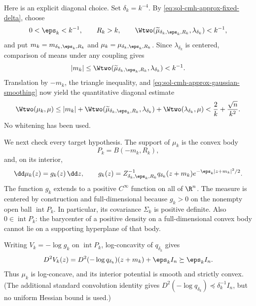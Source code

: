 \documentclass[../main.tex]{subfiles}
\begin{document}
Here is an explicit diagonal choice.  Set $\delta_k=k^{-4}$.  By
\eqref{eq:sol-cmh-approx-fixed-delta}, choose
\[
  0<\eps_k<k^{-1},
  \qquad R_k>k,
  \qquad
  \Wtwo(\widetilde\mu_{\delta_k,\eps_k,R_k},\lambda_{\delta_k})<k^{-1},
\]
and put $m_k=m_{\delta_k,\eps_k,R_k}$ and
$\mu_k=\mu_{\delta_k,\eps_k,R_k}$.  Since $\lambda_{\delta_k}$ is centered, comparison of
means under any coupling gives
\[
  |m_k|
  \le \Wtwo(\widetilde\mu_{\delta_k,\eps_k,R_k},\lambda_{\delta_k})<k^{-1}.
\]
Translation by $-m_k$, the triangle inequality, and
\eqref{eq:sol-cmh-approx-gaussian-smoothing} now yield the quantitative diagonal estimate
\begin{equation}
  \Wtwo(\mu_k,\mu)
  \le |m_k|
      +\Wtwo(\widetilde\mu_{\delta_k,\eps_k,R_k},\lambda_{\delta_k})
      +\Wtwo(\lambda_{\delta_k},\mu)
  <\frac2k+\frac{\sqrt n}{k^2}.
  \label{eq:sol-cmh-approx-diagonal-bound}
\end{equation}
No whitening has been used.

We next check every target hypothesis.  The support of $\mu_k$ is the convex body
\[
  P_k=B(-m_k,R_k),
\]
and, on its interior,
\begin{equation}
  \dd\mu_k(z)=g_k(z)\,\dd z,
  \qquad
  g_k(z)=Z_{\delta_k,\eps_k,R_k}^{-1}
  q_{\delta_k}(z+m_k)e^{-\eps_k|z+m_k|^2/2}.
  \label{eq:sol-cmh-approx-density}
\end{equation}
The function $g_k$ extends to a positive $C^\infty$ function on all of $\R^n$.  The measure is
centered by construction and full-dimensional because $g_k>0$ on the nonempty open ball
$\operatorname{int}P_k$.  In particular, its covariance $\Sigma_k$ is positive definite.
Also $0\in\operatorname{int}P_k$: the barycenter of a positive density on a full-dimensional
convex body cannot lie on a supporting hyperplane of that body.

Writing $V_k=-\log g_k$ on $\operatorname{int}P_k$, log-concavity of $q_{\delta_k}$ gives
\begin{equation}
  D^2V_k(z)
  =D^2(-\log q_{\delta_k})(z+m_k)+\eps_k I_n
  \succeq \eps_k I_n.
  \label{eq:sol-cmh-approx-strict-target}
\end{equation}
Thus $\mu_k$ is log-concave, and its interior potential is smooth and strictly convex.  (The
additional standard convolution identity gives
$D^2(-\log q_{\delta_k})\preceq\delta_k^{-1}I_n$, but no uniform Hessian bound is used.)
\end{document}
